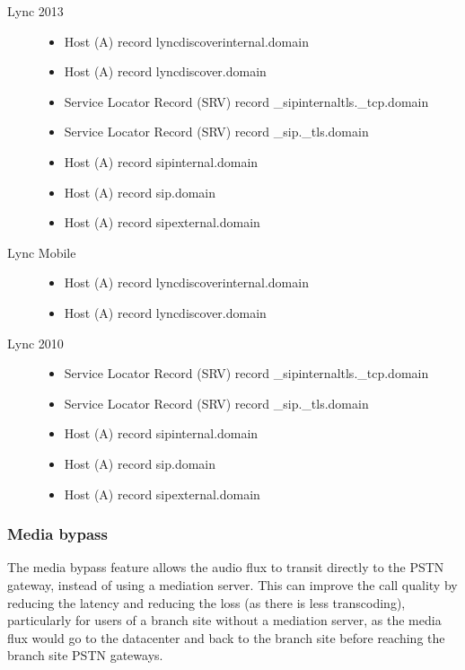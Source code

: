 \begin{description}

\item[Lync 2013]
\begin{itemize}
\item Host (A) record lyncdiscoverinternal.domain
\item Host (A) record lyncdiscover.domain
\item Service Locator Record (SRV) record \_sipinternaltls.\_tcp.domain
\item Service Locator Record (SRV) record \_sip.\_tls.domain
\item Host (A) record sipinternal.domain
\item Host (A) record sip.domain
\item Host (A) record sipexternal.domain
\end{itemize}

\item[Lync Mobile]
\begin{itemize}
\item Host (A) record lyncdiscoverinternal.domain
\item Host (A) record lyncdiscover.domain
\end{itemize}

\item[Lync 2010]
\begin{itemize}
\item Service Locator Record (SRV) record \_sipinternaltls.\_tcp.domain
\item Service Locator Record (SRV) record \_sip.\_tls.domain
\item Host (A) record sipinternal.domain
\item Host (A) record sip.domain
\item Host (A) record sipexternal.domain 
\end{itemize}

\end{description}



\subsubsection{Media bypass}
The media bypass feature allows the audio flux to transit directly to the PSTN gateway, instead of using a mediation server. This can improve the call quality by reducing the latency and reducing the loss (as there is less transcoding), particularly for users of a branch site without a mediation server, as the media flux would go to the datacenter and back to the branch site before reaching the branch site PSTN gateways.

